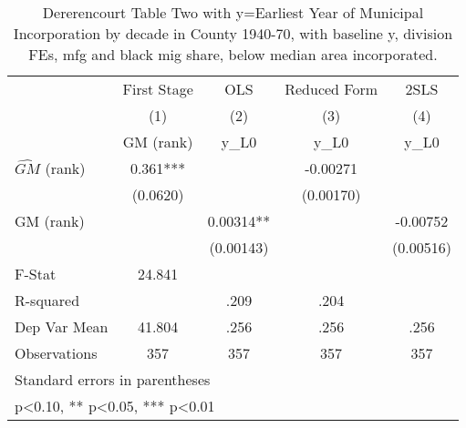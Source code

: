 \begin{table}[htbp]\centering
\def\sym#1{\ifmmode^{#1}\else\(^{#1}\)\fi}
\caption{Dererencourt Table Two with y=Earliest Year of Municipal Incorporation by decade in County 1940-70, with baseline y, division FEs, mfg and black mig share, below median area incorporated.}
\begin{tabular}{l*{4}{c}}
\toprule
                    & First Stage   &         OLS   &Reduced Form   &        2SLS   \\
                    &\multicolumn{1}{c}{(1)}&\multicolumn{1}{c}{(2)}&\multicolumn{1}{c}{(3)}&\multicolumn{1}{c}{(4)}\\
                    &\multicolumn{1}{c}{GM  (rank)}&\multicolumn{1}{c}{y\_L0}&\multicolumn{1}{c}{y\_L0}&\multicolumn{1}{c}{y\_L0}\\
\midrule
$\hat{GM}$ (rank)   &       0.361***&               &    -0.00271   &               \\
                    &    (0.0620)   &               &   (0.00170)   &               \\
\addlinespace
GM  (rank)          &               &     0.00314** &               &    -0.00752   \\
                    &               &   (0.00143)   &               &   (0.00516)   \\
\midrule
F-Stat              &      24.841   &               &               &               \\
R-squared           &               &        .209   &        .204   &               \\
Dep Var Mean        &      41.804   &        .256   &        .256   &        .256   \\
Observations        &         357   &         357   &         357   &         357   \\
\bottomrule
\multicolumn{5}{l}{\footnotesize Standard errors in parentheses}\\
\multicolumn{5}{l}{\footnotesize * p<0.10, ** p<0.05, *** p<0.01}\\
\end{tabular}
\end{table}
